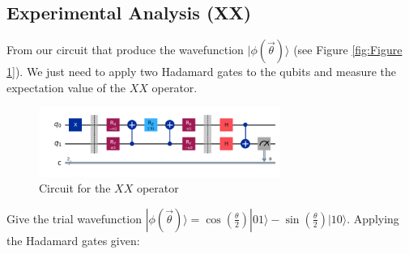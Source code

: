 \documentclass{article}
\begin{document}
\subsection{Experimental Analysis (XX)}
From our circuit that produce the wavefunction \(|\phi(\vec{\theta})\rangle\) (see Figure \ref{fig:Figure 1}). We just need to apply two Hadamard gates to the qubits and measure the expectation value of the \(XX\) operator.
\begin{figure}[H]
	\label{fig:Figure XX}
	\centering
	\includegraphics[width=0.7\textwidth, height=0.2\textheight]{XX.png}
	\caption{Circuit for the \(XX\) operator}
\end{figure}
\noindent Give the trial wavefunction \(|\phi(\vec{\theta})\rangle = \cos\left(\frac{\theta}{2}\right)|01\rangle - \sin\left(\frac{\theta}{2}\right)|10\rangle\). Applying the Hadamard gates given:
\end{document}
